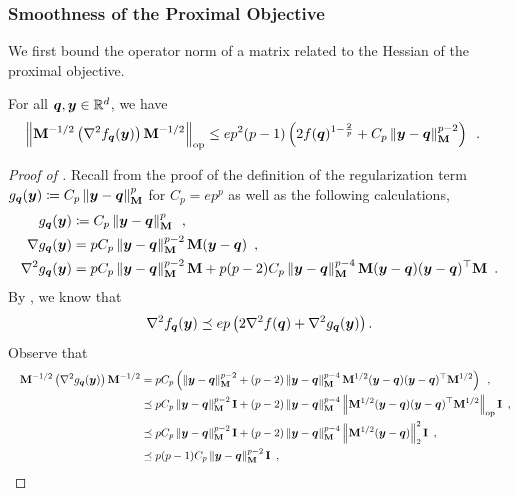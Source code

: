 \subsubsection{Smoothness of the Proximal Objective}

We first bound the operator norm of a matrix related to the Hessian of the proximal objective.

\begin{lemma}
\label{lemma:gp_prox_hessian_opnorm}
For all $\bm{q},\bm{y}\in\mathbb{R}^d$, we have
\begin{align*}
    \left\lVert \mathbf{M}^{-1/2}\left(\nabla^2 f_{\bm{q}}(\bm{y})\right)\mathbf{M}^{-1/2} \right\rVert_{\mathrm{op}} &\le ep^2(p-1)\left(2f(\bm{q})^{1-\frac{2}{p}}+C_p\left\lVert \bm{y}-\bm{q} \right\rVert_{\mathbf{M}}^{p-2}\right)\enspace.
\end{align*}
\end{lemma}
\begin{proof}[Proof of ]
Recall from the proof of  the definition of the regularization term $g_{\bm{q}}(\bm{y}) \coloneqq C_p\left\lVert \bm{y}-\bm{q} \right\rVert_{\mathbf{M}}^p$ for $C_p = ep^p$ as well as the following calculations,
 \begin{align*}
        g_{\bm{q}}(\bm{y}) &\coloneqq C_p\left\lVert \bm{y}-\bm{q} \right\rVert^p_{\mathbf{M}}\enspace,\\    
        \nabla g_{\bm{q}}(\bm{y}) &= pC_p\left\lVert \bm{y}-\bm{q} \right\rVert_{\mathbf{M}}^{p-2}{\mathbf{M}}(\bm{y}-\bm{q})\enspace,\\
        \nabla^2 g_{\bm{q}}(\bm{y}) &= pC_p\left\lVert \bm{y}-\bm{q} \right\rVert_{\mathbf{M}}^{p-2}\mathbf{M} + p(p-2)C_p\left\lVert \bm{y}-\bm{q} \right\rVert_{\mathbf{M}}^{p-4}\mathbf{M}(\bm{y}-\bm{q})(\bm{y}-\bm{q})^{\top}\mathbf{M}\enspace.
\end{align*}
By , we know that
\begin{align*}
    \nabla^2 f_{\bm{q}}(\bm{y}) \preceq ep\left(2\nabla^2 f(\bm{q}) + \nabla^2 g_{\bm{q}}(\bm{y})\right).
\end{align*}
Observe that
\begin{align*}
    \quad \mathbf{M}^{-1/2} \left(\nabla^2 g_{\bm{q}}(\bm{y})\right) \mathbf{M}^{-1/2} &= pC_p\left(\left\lVert \bm{y}-\bm{q} \right\rVert_{\mathbf{M}}^{p-2}+(p-2)\left\lVert \bm{y}-\bm{q} \right\rVert_{\mathbf{M}}^{p-4}\mathbf{M}^{1/2}(\bm{y}-\bm{q})(\bm{y}-\bm{q})^{\top}\mathbf{M}^{1/2}\right)\enspace,\\
    &\preceq pC_p\left\lVert \bm{y}-\bm{q} \right\rVert_{\mathbf{M}}^{p-2}\mathbf{I} + (p-2)\left\lVert \bm{y}-\bm{q} \right\rVert_{\mathbf{M}}^{p-4}\left\lVert \mathbf{M}^{1/2}(\bm{y}-\bm{q})(\bm{y}-\bm{q})^{\top}\mathbf{M}^{1/2} \right\rVert_{\mathrm{op}}\mathbf{I}\enspace,\\
    &\preceq pC_p\left\lVert \bm{y}-\bm{q} \right\rVert_{\mathbf{M}}^{p-2}\mathbf{I} + (p-2)\left\lVert \bm{y}-\bm{q} \right\rVert_{\mathbf{M}}^{p-4}\left\lVert \mathbf{M}^{1/2}(\bm{y}-\bm{q}) \right\rVert_2^2\mathbf{I}\enspace,\\ 
    &\preceq p(p-1)C_p \left\lVert \bm{y}-\bm{q} \right\rVert_{\mathbf{M}}^{p-2}\mathbf{I}\enspace,
\end{align*}

\end{proof}
